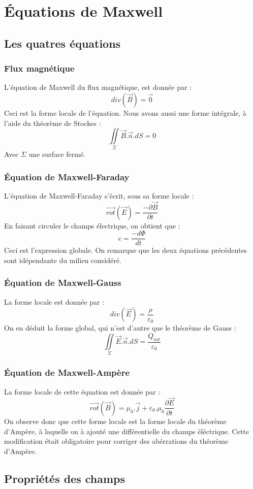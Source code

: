 \chapter{Équations de Maxwell}
\section{Les quatres équations}
\subsection{Flux magnétique}
L'équation de Maxwell du flux magnétique, est donnée par : 
$$div(\overrightarrow{B}) = \overrightarrow{0}$$
Ceci est la forme locale de l'équation. Nous avons aussi une forme intégrale, à l'aide du théorème de Stockes : 
$$\underset{\Sigma}\iint \overrightarrow{B}.\overrightarrow{n}.dS = 0$$
Avec $\Sigma$ une surface fermé.
\subsection{Équation de Maxwell-Faraday}
L'équation de Maxwell-Faraday s'écrit, sous sa forme locale :
$$\overrightarrow{rot}(\overrightarrow{E}) = \dfrac{- \partial \overrightarrow{B}}{\partial t}$$
En faisant circuler le champs électrique, on obtient que : 
$$e = \dfrac{-d \Phi}{dt}$$
Ceci est l'expression globale. On remarque que les deux équations précédentes sont idépendante du milieu considéré.
\subsection{Équation de Maxwell-Gauss}
La forme locale est donnée par :
$$div(\overrightarrow{E}) = \dfrac{\rho}{\varepsilon_0}$$
On en déduit la forme global, qui n'est d'autre que le théorème de Gauss : 
$$\underset{\Sigma}\iint \overrightarrow{E}.\overrightarrow{n}.dS = \dfrac{Q_{int}}{\varepsilon_0}$$
\subsection{Équation de Maxwell-Ampère}
La forme locale de cette équation est donnée par :
$$\overrightarrow{rot}(\overrightarrow{B}) = \mu_0.\overrightarrow{j} + \varepsilon_0.\mu_0\dfrac{\partial \overrightarrow{E}}{\partial t}$$
On observe donc que cette forme locale est la forme locale du théorème d'Ampère, à laquelle on à ajouté une différentielle du champs éléctrique. Cette modification était obligatoire pour corriger des abérrations du théorème d'Ampère.
\section{Propriétés des champs}
